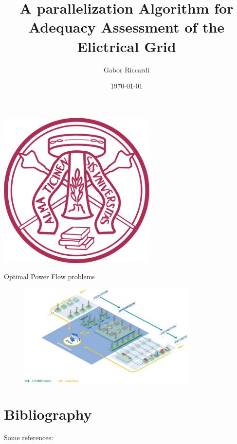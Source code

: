 \documentclass[11pt, aspectratio=169]{beamer}
\title{A parallelization Algorithm for Adequacy Assessment of the Elictrical Grid}
\author{Gabor Riccardi}
\date{\today}
\institute{Università di Pavia}
\begin{document}
\begin{frame}[plain]
\centering
\includegraphics[scale=0.5]{unipv.png}
\maketitle
\end{frame}

\begin{frame}{Optimal Power Flow problems}
    \begin{figure}
        \centering
        \includegraphics[width=0.8\textwidth]{photo_2023-09-26_14-27-16.jpg}
        \label{fig:enter-label}
    \end{figure}
\end{frame}


\begin{frame}
	\tableofcontents
\end{frame}






\section{Bibliography}
\begin{frame}{}
Some references:\\[2em]
\begin{footnotesize}
\printbibliography[
title={Bibliography}]
\end{footnotesize}
\end{frame}
\end{document}
